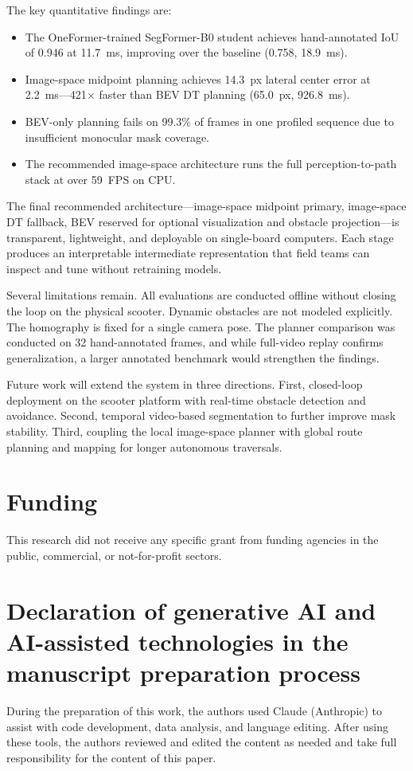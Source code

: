\documentclass[a4paper,fleqn,10pt]{cas-dc}
\begin{document}
The key quantitative findings are:
\begin{itemize}[nosep]
    \item The OneFormer-trained SegFormer-B0 student achieves hand-annotated IoU of 0.946 at \SI{11.7}{ms}, improving over the baseline (0.758, \SI{18.9}{ms}).
    \item Image-space midpoint planning achieves 14.3~px lateral center error at \SI{2.2}{ms}---421$\times$ faster than BEV DT planning (65.0~px, \SI{926.8}{ms}).
    \item BEV-only planning fails on 99.3\% of frames in one profiled sequence due to insufficient monocular mask coverage.
    \item The recommended image-space architecture runs the full perception-to-path stack at over 59~FPS on CPU.
\end{itemize}

The final recommended architecture---image-space midpoint primary, image-space DT fallback, BEV reserved for optional visualization and obstacle projection---is transparent, lightweight, and deployable on single-board computers. Each stage produces an interpretable intermediate representation that field teams can inspect and tune without retraining models.

Several limitations remain. All evaluations are conducted offline without closing the loop on the physical scooter. Dynamic obstacles are not modeled explicitly. The homography is fixed for a single camera pose. The planner comparison was conducted on 32 hand-annotated frames, and while full-video replay confirms generalization, a larger annotated benchmark would strengthen the findings.

Future work will extend the system in three directions. First, closed-loop deployment on the scooter platform with real-time obstacle detection and avoidance. Second, temporal video-based segmentation to further improve mask stability. Third, coupling the local image-space planner with global route planning and mapping for longer autonomous traversals.

\section*{Funding}
This research did not receive any specific grant from funding agencies in the
public, commercial, or not-for-profit sectors.

\section*{Declaration of generative AI and AI-assisted technologies in the manuscript preparation process}
During the preparation of this work, the authors used Claude (Anthropic) to assist
with code development, data analysis, and language editing. After using these
tools, the authors reviewed and edited the content as needed and take full
responsibility for the content of this paper.
\end{document}
